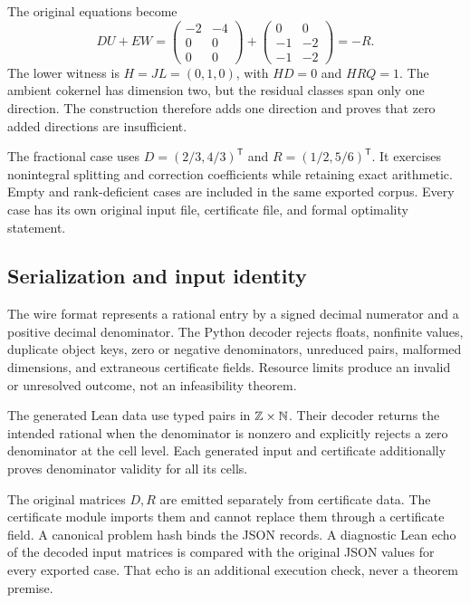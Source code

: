 The original equations become
\[
 DU+EW=
 \begin{pmatrix}-2&-4\\0&0\\0&0\end{pmatrix}+
 \begin{pmatrix}0&0\\-1&-2\\-1&-2\end{pmatrix}=-R.
\]
The lower witness is $H=JL=(0,1,0)$, with $HD=0$ and $HRQ=1$. The ambient cokernel has dimension two, but the residual classes span only one direction. The construction therefore adds one direction and proves that zero added directions are insufficient.

The fractional case uses $D=(2/3,4/3)^{\mathsf T}$ and $R=(1/2,5/6)^{\mathsf T}$. It exercises nonintegral splitting and correction coefficients while retaining exact arithmetic. Empty and rank-deficient cases are included in the same exported corpus. Every case has its own original input file, certificate file, and formal optimality statement.

\subsection{Serialization and input identity}
The wire format represents a rational entry by a signed decimal numerator and a positive decimal denominator. The Python decoder rejects floats, nonfinite values, duplicate object keys, zero or negative denominators, unreduced pairs, malformed dimensions, and extraneous certificate fields. Resource limits produce an invalid or unresolved outcome, not an infeasibility theorem.

The generated Lean data use typed pairs in $\mathbb{Z}\times\mathbb{N}$. Their decoder returns the intended rational when the denominator is nonzero and explicitly rejects a zero denominator at the cell level. Each generated input and certificate additionally proves denominator validity for all its cells.

The original matrices $D,R$ are emitted separately from certificate data. The certificate module imports them and cannot replace them through a certificate field. A canonical problem hash binds the JSON records. A diagnostic Lean echo of the decoded input matrices is compared with the original JSON values for every exported case. That echo is an additional execution check, never a theorem premise.

